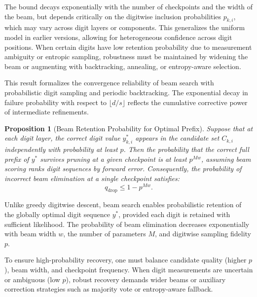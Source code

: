 \documentclass[aps,twocolumn,superscriptaddress,nofootinbib]{revtex4}
\newtheorem{proposition}{Proposition}
\begin{document}
The bound decays exponentially with the number of checkpoints and the width of the beam, but depends critically on the digitwise inclusion probabilities \( p_{k,i} \), which may vary across digit layers or components. This generalizes the uniform model in earlier versions, allowing for heterogeneous confidence across digit positions. When certain digits have low retention probability due to measurement ambiguity or entropic sampling, robustness must be maintained by widening the beam or augmenting with backtracking, annealing, or entropy-aware selection.

This result formalizes the convergence reliability of beam search with probabilistic digit sampling and periodic backtracking. The exponential decay in failure probability with respect to $\lfloor d/s \rfloor$ reflects the cumulative corrective power of intermediate refinements.

\begin{proposition}[Beam Retention Probability for Optimal Prefix]
Suppose that at each digit layer, the correct digit value \( y^\ast_{k,i} \) appears in the candidate set \( C_{k,i} \) independently with probability at least \( p \). Then the probability that the correct full prefix of \( y^\ast \) survives pruning at a given checkpoint is at least \( p^{Mw} \), assuming beam scoring ranks digit sequences by forward error. Consequently, the probability of incorrect beam elimination at a single checkpoint satisfies:
\begin{equation}
q_{\mathrm{drop}} \leq 1 - p^{Mw}.
\end{equation}
\end{proposition}

Unlike greedy digitwise descent, beam search enables probabilistic retention of the globally optimal digit sequence \( y^\ast \), provided each digit is retained with sufficient likelihood. The probability of beam elimination decreases exponentially with beam width \( w \), the number of parameters \( M \), and digitwise sampling fidelity \( p \). 

To ensure high-probability recovery, one must balance candidate quality (higher \( p \)), beam width, and checkpoint frequency. When digit measurements are uncertain or ambiguous (low \( p \)), robust recovery demands wider beams or auxiliary correction strategies such as majority vote or entropy-aware fallback.
\end{document}

